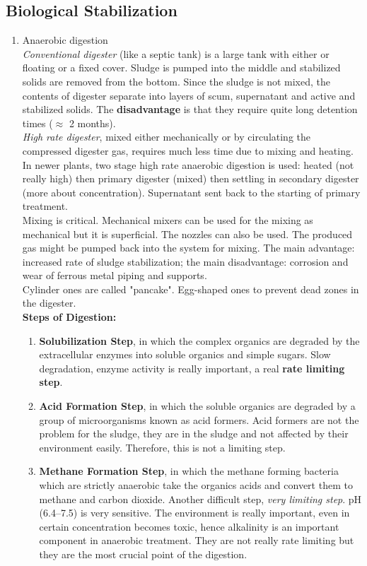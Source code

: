 \documentclass{article}
\numberwithin{equation}{section}
\begin{document}
\subsection{Biological Stabilization}
\begin{enumerate}
    \item Anaerobic digestion\\
    \emph{Conventional digester} (like a septic tank) is a large tank with either or floating or a fixed cover. Sludge is pumped into the middle and stabilized solids are removed from the bottom. Since the sludge is not mixed, the contents of digester separate into layers of scum, supernatant and active and stabilized solids. The \textbf{disadvantage} is that they require quite long detention times ($\approx$ 2 months).\\
    \emph{High rate digester}, mixed either mechanically or by circulating the compressed digester gas, requires much less time due to mixing and heating. In newer plants, two stage high rate anaerobic digestion is used: heated (not really high) then primary digester (mixed) then settling in secondary digester (more about concentration). Supernatant sent back to the starting of primary treatment.\\
    Mixing is critical. Mechanical mixers can be used for the mixing as mechanical but it is superficial. The nozzles can also be used. The produced gas might be pumped back into the system for mixing. The main advantage: increased rate of sludge stabilization; the main disadvantage: corrosion and wear of ferrous metal piping and supports.\\
    Cylinder ones are called "pancake". Egg-shaped ones to prevent dead zones in the digester.\\
    \textbf{Steps of Digestion:}
    \begin{enumerate}
        \item \textbf{Solubilization Step}, in which the complex organics are degraded by the extracellular enzymes into soluble organics and simple sugars. Slow degradation, enzyme activity is really important, a real \textbf{rate limiting step}.
        \item \textbf{Acid Formation Step}, in which the soluble organics are degraded by a group of microorganisms known as acid formers. Acid formers are not the problem for the sludge, they are in the sludge and not affected by their environment easily. Therefore, this is not a limiting step.
        \item \textbf{Methane Formation Step}, in which the methane forming bacteria which are strictly anaerobic take the organics acids and convert them to methane and carbon dioxide. Another difficult step, \emph{very limiting step}. pH (6.4--7.5) is very sensitive. The environment is really important, even  in certain concentration becomes toxic, hence alkalinity is an important component in anaerobic treatment. They are not really rate limiting but they are the most crucial point of the digestion.

\end{enumerate}
\end{enumerate}
\end{document}
